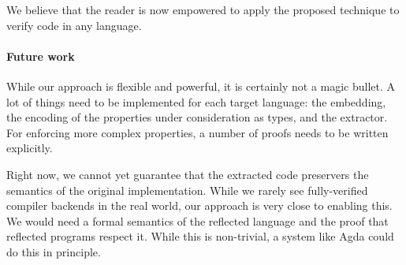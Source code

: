 \documentclass[sigplan,screen,anonymous,review]{acmart}
\newcommand{\AK}[1]{\AgdaKeyword{#1}}
\begin{document}
We believe that the reader is now empowered to apply the proposed
technique to verify code in any language.



\paragraph{Future work}
While our approach is flexible and powerful, it is
certainly not a magic bullet. A lot of things
need to be implemented for each target language: the embedding,
the encoding of the properties under consideration as types,
and the extractor.  For enforcing more complex properties, a number
of proofs needs to be written explicitly.

Right now, we cannot yet guarantee that the
extracted code preservers the semantics of the original
implementation. While we rarely see
fully-verified compiler backends in the real world,
our approach is very close to enabling this.
We would need a formal semantics of the reflected language
and the proof that reflected programs respect it.
While this is non-trivial, a system like Agda could do
this in principle.

%



\end{document}
